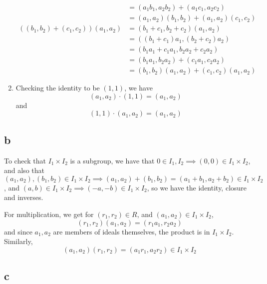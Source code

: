 \documentclass[12pt,letterpaper]{article}
\theoremstyle{definition}
\begin{document}
\begin{enumerate}
\begin{align*}
                                                         &= (a_{1}b_{1}, a_{2}b_{2}) + (a_{1}c_{1}, a_{2}c_{2}) \\
                                                         &= (a_{1},a_{2})(b_{1},b_{2}) + (a_{1},a_{2})(c_{1},c_{2}) \\
          ((b_{1}, b_{2}) + (c_{1}, c_{2}))(a_{1},a_{2}) &= (b_{1} + c_{1}, b_{2} + c_{2})(a_{1},a_{2}) \\
                                                         &= ((b_{1} + c_{1})a_{1}, (b_{2} + c_{2})a_{2}) \\
                                                         &= (b_{1}a_{1} + c_{1}a_{1}, b_{2}a_{2} + c_{2}a_{2}) \\
                                                         &= (b_{1}a_{1}, b_{2}a_{2}) + (c_{1}a_{1}, c_{2}a_{2}) \\
                                                         &= (b_{1},b_{2})(a_{1},a_{2}) + (c_{1},c_{2})(a_{1},a_{2})
        \end{align*}
  \item Checking the identity to be $(1,1)$, we have
        \[
        (a_{1}, a_{2}) \cdot (1,1) = (a_{1}, a_{2})
        \]
        and
        \[
        (1,1) \cdot (a_{1}, a_{2}) = (a_{1}, a_{2})
        \]
\end{enumerate}

\subsection*{b}

To check that $I_{1} \times I_{2}$ is a subgroup, we have that $0 \in I_{1}, I_{2} \implies (0, 0) \in I_{1} \times I_{2}$, and also that $(a_{1}, a_{2}), (b_{1}, b_{2}) \in I_{1} \times I_{2} \implies (a_{1}, a_{2}) + (b_{1}, b_{2}) = (a_{1} + b_{1}, a_{2} + b_{2}) \in I_{1} \times I_{2}$, and $(a, b) \in I_{1} \times I_{2} \implies (-a, -b) \in I_{1} \times I_{2}$, so we have the identity, closure and inverses.

For multiplication, we get for $(r_{1}, r_{2}) \in R$, and $(a_{1}, a_{2}) \in I_{1} \times I_{2}$,
\[
  (r_{1}, r_{2})(a_{1}, a_{2}) = (r_{1}a_{1}, r_{2}a_{2})
\]
and since $a_{1}, a_{2}$ are members of ideals themselves, the product is in $I_{1} \times I_{2}$. Similarly,
\[
  (a_{1}, a_{2})(r_{1}, r_{2}) = (a_{1}r_{1}, a_{2}r_{2}) \in I_{1} \times I_{2}
\]

\subsection*{c}
\end{document}
